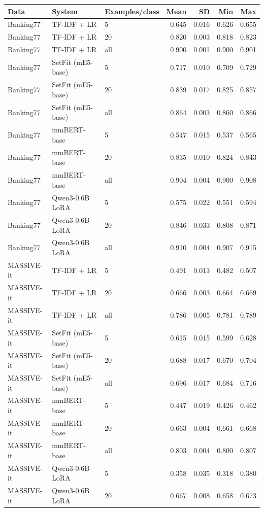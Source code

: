 \begin{tabular}{lllrrrr}
\toprule
Data & System & Examples/class & Mean & SD & Min & Max \\
\midrule
Banking77 & TF-IDF + LR & 5 & 0.645 & 0.016 & 0.626 & 0.655 \\
Banking77 & TF-IDF + LR & 20 & 0.820 & 0.003 & 0.818 & 0.823 \\
Banking77 & TF-IDF + LR & all & 0.900 & 0.001 & 0.900 & 0.901 \\
Banking77 & SetFit (mE5-base) & 5 & 0.717 & 0.010 & 0.709 & 0.729 \\
Banking77 & SetFit (mE5-base) & 20 & 0.839 & 0.017 & 0.825 & 0.857 \\
Banking77 & SetFit (mE5-base) & all & 0.864 & 0.003 & 0.860 & 0.866 \\
Banking77 & mmBERT-base & 5 & 0.547 & 0.015 & 0.537 & 0.565 \\
Banking77 & mmBERT-base & 20 & 0.835 & 0.010 & 0.824 & 0.843 \\
Banking77 & mmBERT-base & all & 0.904 & 0.004 & 0.900 & 0.908 \\
Banking77 & Qwen3-0.6B LoRA & 5 & 0.575 & 0.022 & 0.551 & 0.594 \\
Banking77 & Qwen3-0.6B LoRA & 20 & 0.846 & 0.033 & 0.808 & 0.871 \\
Banking77 & Qwen3-0.6B LoRA & all & 0.910 & 0.004 & 0.907 & 0.915 \\
\midrule
MASSIVE-it & TF-IDF + LR & 5 & 0.491 & 0.013 & 0.482 & 0.507 \\
MASSIVE-it & TF-IDF + LR & 20 & 0.666 & 0.003 & 0.664 & 0.669 \\
MASSIVE-it & TF-IDF + LR & all & 0.786 & 0.005 & 0.781 & 0.789 \\
MASSIVE-it & SetFit (mE5-base) & 5 & 0.615 & 0.015 & 0.599 & 0.628 \\
MASSIVE-it & SetFit (mE5-base) & 20 & 0.688 & 0.017 & 0.670 & 0.704 \\
MASSIVE-it & SetFit (mE5-base) & all & 0.696 & 0.017 & 0.684 & 0.716 \\
MASSIVE-it & mmBERT-base & 5 & 0.447 & 0.019 & 0.426 & 0.462 \\
MASSIVE-it & mmBERT-base & 20 & 0.663 & 0.004 & 0.661 & 0.668 \\
MASSIVE-it & mmBERT-base & all & 0.803 & 0.004 & 0.800 & 0.807 \\
MASSIVE-it & Qwen3-0.6B LoRA & 5 & 0.358 & 0.035 & 0.318 & 0.380 \\
MASSIVE-it & Qwen3-0.6B LoRA & 20 & 0.667 & 0.008 & 0.658 & 0.673 \\

\end{tabular}
